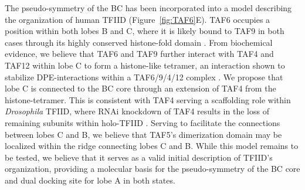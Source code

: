 \indent The pseudo-symmetry of the BC has been incorporated into a model describing the organization of human TFIID (Figure~\ref{fig:TAF6}E). TAF6 occupies a position within both lobes B and C, where it is likely bound to TAF9 in both cases through its highly conserved histone-fold domain \cite{Shao_1340}. From biochemical evidence, we believe that TAF6 and TAF9 further interact with TAF4 and TAF12 within lobe C to form a histone-like tetramer, an interaction shown to stabilize DPE-interactions within a TAF6/9/4/12 complex \cite{Shao_1340}. We propose that lobe C is connected to the BC core through an extension of TAF4 from the histone-tetramer. This is consistent with TAF4 serving a scaffolding role within \emph{Drosophila} TFIID, where RNAi knockdown of TAF4 results in the loss of remaining subunits within holo-TFIID \cite{Wright_1170}. Serving to facilitate the connections between lobes C and B, we believe that TAF5's dimerization domain may be localized within the ridge connecting lobes C and B. While this model remains to be tested, we believe that it serves as a valid initial description of TFIID's organization, providing a molecular basis for the pseudo-symmetry of the BC core and dual docking site for lobe A in both states. 
